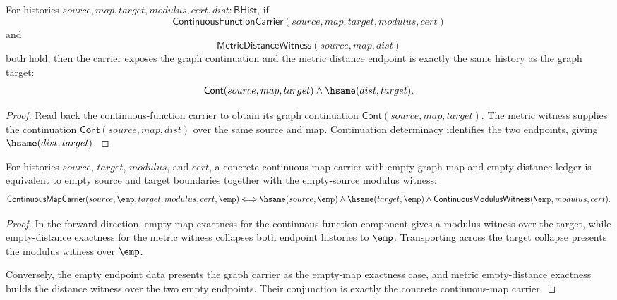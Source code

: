 \begin{theorem}
\label{thm:continuousmap-function-carrier-metric-graph-exactness}
For histories $source,map,target,modulus,cert,dist:\mathsf{BHist}$, if
$$
\mathsf{ContinuousFunctionCarrier}(source,map,target,modulus,cert)
$$
and
$$
\mathsf{MetricDistanceWitness}(source,map,dist)
$$
both hold, then the carrier exposes the graph continuation and the metric
distance endpoint is exactly the same history as the graph target:
$$
\mathsf{Cont}(source,map,target)\land \hsame(dist,target).
$$
\end{theorem}
\begin{proof}
Read back the continuous-function carrier to obtain its graph continuation
$\mathsf{Cont}(source,map,target)$. The metric witness supplies the continuation
$\mathsf{Cont}(source,map,dist)$ over the same source and map. Continuation
determinacy identifies the two endpoints, giving $\hsame(dist,target)$.
\end{proof}

\begin{theorem}
\label{thm:continuousmap-empty-map-empty-distance-boundaries}
For histories $source$, $target$, $modulus$, and $cert$, a concrete
continuous-map carrier with empty graph map and empty distance ledger is
equivalent to empty source and target boundaries together with the empty-source
modulus witness:
$$
\mathsf{ContinuousMapCarrier}(source,\emp,target,modulus,cert,\emp)
\Longleftrightarrow
\hsame(source,\emp)\land\hsame(target,\emp)\land
\mathsf{ContinuousModulusWitness}(\emp,modulus,cert).
$$
\end{theorem}
\begin{proof}
In the forward direction, empty-map exactness for the continuous-function
component gives a modulus witness over the target, while empty-distance
exactness for the metric witness collapses both endpoint histories to
$\emp$. Transporting across the target collapse presents the modulus witness
over $\emp$.

Conversely, the empty endpoint data presents the graph carrier as the
empty-map exactness case, and metric empty-distance exactness builds the
distance witness over the two empty endpoints. Their conjunction is exactly the
concrete continuous-map carrier.
\end{proof}

